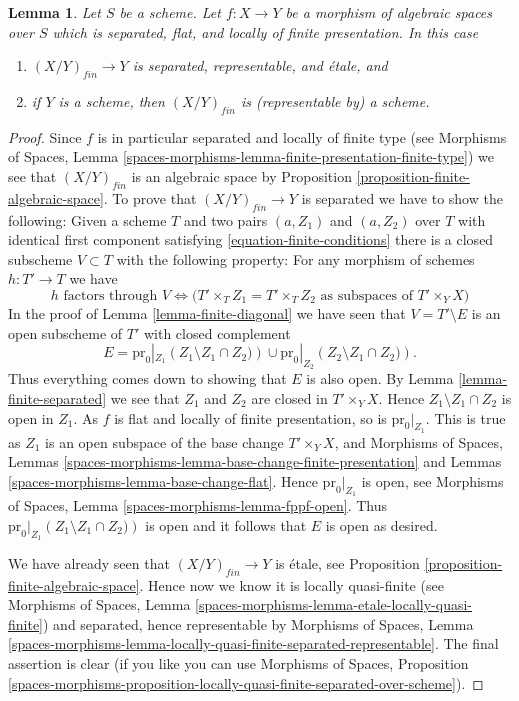 \documentclass{stacks-project}
\theoremstyle{plain}
\newtheorem{lemma}[subsection]{Lemma}
\theoremstyle{definition}
\theoremstyle{remark}
\numberwithin{equation}{subsection}
\begin{document}
\begin{lemma}
\label{lemma-finite-separated-flat-locally-finite-presentation}
Let $S$ be a scheme.
Let $f : X \to Y$ be a morphism of algebraic spaces over $S$ which
is separated, flat, and locally of finite presentation.
In this case
\begin{enumerate}
\item $(X/Y)_{fin} \to Y$ is separated, representable, and \'etale, and
\item if $Y$ is a scheme, then $(X/Y)_{fin}$ is (representable by) a scheme.
\end{enumerate}
\end{lemma}

\begin{proof}
Since $f$ is in particular separated and locally of finite type (see
Morphisms of Spaces,
Lemma \ref{spaces-morphisms-lemma-finite-presentation-finite-type})
we see that $(X/Y)_{fin}$ is an algebraic space by
Proposition \ref{proposition-finite-algebraic-space}.
To prove that $(X/Y)_{fin} \to Y$ is separated we have to show
the following: Given a scheme $T$ and two pairs $(a, Z_1)$ and $(a, Z_2)$
over $T$
with identical first component satisfying \ref{equation-finite-conditions}
there is a closed subscheme $V \subset T$ with the following
property: For any morphism of schemes $h : T' \to T$ we have
$$
h \text{ factors through } V \Leftrightarrow
\Big(T' \times_T Z_1 = T' \times_T Z_2
\text{ as subspaces of }T' \times_Y X\Big)
$$
In the proof of
Lemma \ref{lemma-finite-diagonal}
we have seen that $V = T' \setminus E$ is an open subscheme of $T'$
with closed complement
$$
E =
\text{pr}_0|_{Z_1}\left(Z_1 \setminus Z_1 \cap Z_2)\right)
\cup
\text{pr}_0|_{Z_2}\left(Z_2 \setminus Z_1 \cap Z_2)\right).
$$
Thus everything comes down to showing that $E$ is also open. By
Lemma \ref{lemma-finite-separated}
we see that $Z_1$ and $Z_2$ are closed in $T' \times_Y X$. Hence
$Z_1 \setminus Z_1 \cap Z_2$ is open in $Z_1$. As $f$ is flat and
locally of finite presentation, so is $\text{pr}_0|_{Z_1}$.
This is true as $Z_1$ is an open subspace of the base change
$T' \times_Y X$, and
Morphisms of Spaces,
Lemmas \ref{spaces-morphisms-lemma-base-change-finite-presentation} and
Lemmas \ref{spaces-morphisms-lemma-base-change-flat}.
Hence $\text{pr}_0|_{Z_1}$ is open, see
Morphisms of Spaces, Lemma \ref{spaces-morphisms-lemma-fppf-open}.
Thus $\text{pr}_0|_{Z_1}\left(Z_1 \setminus Z_1 \cap Z_2)\right)$ is
open and it follows that $E$ is open as desired.

\medskip\noindent
We have already seen that $(X/Y)_{fin} \to Y$ is \'etale, see
Proposition \ref{proposition-finite-algebraic-space}.
Hence now we know it is locally quasi-finite (see
Morphisms of Spaces,
Lemma \ref{spaces-morphisms-lemma-etale-locally-quasi-finite})
and separated, hence representable by
Morphisms of Spaces, Lemma
\ref{spaces-morphisms-lemma-locally-quasi-finite-separated-representable}.
The final assertion is clear (if you like you can use
Morphisms of Spaces, Proposition
\ref{spaces-morphisms-proposition-locally-quasi-finite-separated-over-scheme}).
\end{proof}
\end{document}
